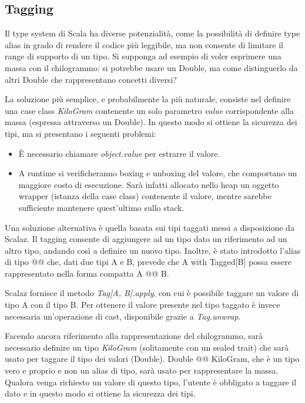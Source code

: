 \subsection{Tagging}

Il type system di Scala ha diverse potenzialità, come la possibilità di definire type alias in grado di rendere il codice più leggibile, ma non consente di limitare il range di supporto di un tipo. Si supponga ad esempio di voler esprimere una massa con il chilogrammo: si potrebbe usare un Double, ma come distinguerlo da altri Double che rappresentano concetti diversi?

La soluzione più semplice, e probabilmente la più naturale, consiste nel definire una case class \textit{KiloGram} contenente un solo parametro \textit{value} corrispondente alla massa (espressa attraverso un Double). In questo modo si ottiene la sicurezza dei tipi, ma si presentano i seguenti problemi:

\begin{itemize}
\item È necessario chiamare \textit{object.value} per estrarre il valore.
\item A runtime si verificheranno boxing e unboxing del valore, che comportano un maggiore costo di esecuzione. Sarà infatti allocato nello heap un oggetto wrapper (istanza della case class) contenente il valore, mentre sarebbe sufficiente mantenere quest'ultimo sullo stack.
\end{itemize}

Una soluzione alternativa è quella basata sui tipi taggati messi a disposizione da Scalaz. Il tagging consente di aggiungere ad un tipo dato un riferimento ad un altro tipo, andando così a definire un nuovo tipo. Inoltre, è stato introdotto l'alias di tipo @@ che, dati due tipi A e B, prevede che A with Tagged[B] possa essere rappresentato nella forma compatta A @@ B.

Scalaz fornisce il metodo \textit{Tag[A, B].apply}, con cui è possibile taggare un valore di tipo A con il tipo B. Per ottenere il valore presente nel tipo taggato è invece necessaria un'operazione di cast, disponibile grazie a \textit{Tag.unwrap}.

Facendo ancora riferimento alla rappresentazione del chilogrammo, sarà necessario definire un tipo \textit{KiloGram} (solitamente con un sealed trait) che sarà usato per taggare il tipo dei valori (Double). Double @@ KiloGram, che è un tipo vero e proprio e non un alias di tipo, sarà usato per rappresentare la massa. Qualora venga richiesto un valore di questo tipo, l'utente è obbligato a taggare il dato e in questo modo si ottiene la sicurezza dei tipi.

